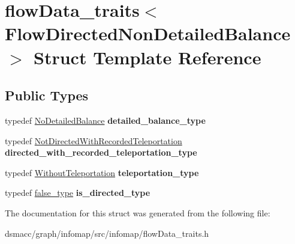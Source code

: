 \hypertarget{structflowData__traits_3_01FlowDirectedNonDetailedBalance_01_4}{}\section{flow\+Data\+\_\+traits$<$ Flow\+Directed\+Non\+Detailed\+Balance $>$ Struct Template Reference}
\label{structflowData__traits_3_01FlowDirectedNonDetailedBalance_01_4}
\subsection*{Public Types}
\begin{DoxyCompactItemize}
\item 
\mbox{\label{structflowData__traits_3_01FlowDirectedNonDetailedBalance_01_4_a9c83c8e35da15499d97654d70f582bc5}} 
typedef \mbox{\hyperlink{structNoDetailedBalance}{No\+Detailed\+Balance}} {\bfseries detailed\+\_\+balance\+\_\+type}
\item 
\mbox{\label{structflowData__traits_3_01FlowDirectedNonDetailedBalance_01_4_a25a18ffdb9827493f4ce7ca3dc834d0d}} 
typedef \mbox{\hyperlink{structNotDirectedWithRecordedTeleportation}{Not\+Directed\+With\+Recorded\+Teleportation}} {\bfseries directed\+\_\+with\+\_\+recorded\+\_\+teleportation\+\_\+type}
\item 
\mbox{\label{structflowData__traits_3_01FlowDirectedNonDetailedBalance_01_4_acd37beaad27fb44f77b9dd503c65e917}} 
typedef \mbox{\hyperlink{structWithoutTeleportation}{Without\+Teleportation}} {\bfseries teleportation\+\_\+type}
\item 
\mbox{\label{structflowData__traits_3_01FlowDirectedNonDetailedBalance_01_4_a970db404aaa6b0ae0b34c15e838a2e4e}} 
typedef \mbox{\hyperlink{structfalse__type}{false\+\_\+type}} {\bfseries is\+\_\+directed\+\_\+type}
\end{DoxyCompactItemize}


The documentation for this struct was generated from the following file\+:\begin{DoxyCompactItemize}
\item 
dsmacc/graph/infomap/src/infomap/flow\+Data\+\_\+traits.\+h\end{DoxyCompactItemize}
